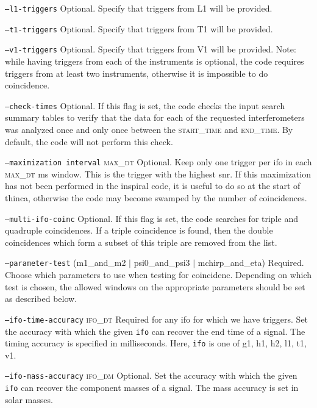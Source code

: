 \begin{entry}
\begin{entry}
\item[\texttt{--l1-triggers}] Optional.  Specify that triggers from L1 will be
provided.
\item[\texttt{--t1-triggers}] Optional.  Specify that triggers from T1 will be
provided.
\item[\texttt{--v1-triggers}] Optional.  Specify that triggers from V1 will be
provided.  Note: while having triggers from each of the instruments is
optional, the code requires triggers from at least two instruments, otherwise
it is impossible to do coincidence.

\item[\texttt{--check-times}] Optional.  If this flag is set, the code checks
the input search summary tables to verify that the data for each of the
requested interferometers was analyzed once and only once between the
\textsc{start\_time} and \textsc{end\_time}.  By default, the code will not
perform this check.

\item[\texttt{--maximization interval} \textsc{max\_dt}] Optional.  Keep only
one trigger per ifo in each \textsc{max\_dt} ms window.  This is the trigger
with the highest snr.  If this maximization has not been performed in the
inspiral code, it is useful to do so at the start of thinca, otherwise the
code may become swamped by the number of coincidences.

\item[\texttt{--multi-ifo-coinc}] Optional.  If this flag is set, the code
searches for triple and quadruple coincidences.  If a triple coincidence is 
found, then the double coincidences which form a subset of this triple are
removed from the list.

\item[\texttt{--parameter-test}
(m1\_and\_m2 $\mid$ psi0\_and\_psi3 $\mid$ mchirp\_and\_eta)]
Required. Choose which parameters to use when testing for coincidenc.
Depending on which test is chosen, the allowed windows on the appropriate
parameters should be set as described below.

\item[\texttt{--ifo-time-accuracy} \textsc{ifo\_dt}] Required for any ifo for
which we have triggers. Set the accuracy with which the given \texttt{ifo} can
recover the end time of a signal.  The timing accuracy is specified in
milliseconds. Here, \texttt{ifo} is one of g1, h1, h2, l1, t1, v1.

\item[\texttt{--ifo-mass-accuracy} \textsc{ifo\_dm}] Optional. Set the
accuracy with which the given \texttt{ifo} can recover the component masses of
a signal.  The mass accuracy is set in solar masses.


\end{entry}
\end{entry}
